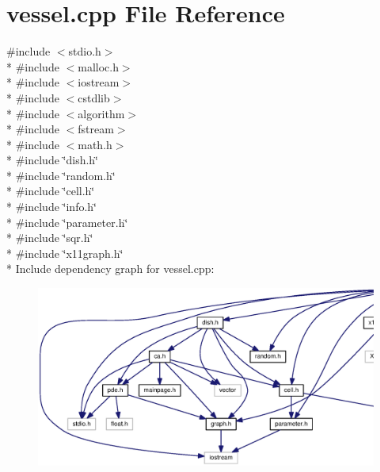 \section{vessel.\-cpp File Reference}
\label{vessel_8cpp}
{\ttfamily \#include $<$stdio.\-h$>$}\\*
{\ttfamily \#include $<$malloc.\-h$>$}\\*
{\ttfamily \#include $<$iostream$>$}\\*
{\ttfamily \#include $<$cstdlib$>$}\\*
{\ttfamily \#include $<$algorithm$>$}\\*
{\ttfamily \#include $<$fstream$>$}\\*
{\ttfamily \#include $<$math.\-h$>$}\\*
{\ttfamily \#include \char`\"{}dish.\-h\char`\"{}}\\*
{\ttfamily \#include \char`\"{}random.\-h\char`\"{}}\\*
{\ttfamily \#include \char`\"{}cell.\-h\char`\"{}}\\*
{\ttfamily \#include \char`\"{}info.\-h\char`\"{}}\\*
{\ttfamily \#include \char`\"{}parameter.\-h\char`\"{}}\\*
{\ttfamily \#include \char`\"{}sqr.\-h\char`\"{}}\\*
{\ttfamily \#include \char`\"{}x11graph.\-h\char`\"{}}\\*
Include dependency graph for vessel.\-cpp\-:
\nopagebreak
\begin{figure}[H]
\begin{center}
\leavevmode
\includegraphics[width=350pt]{vessel_8cpp__incl}
\end{center}
\end{figure}
